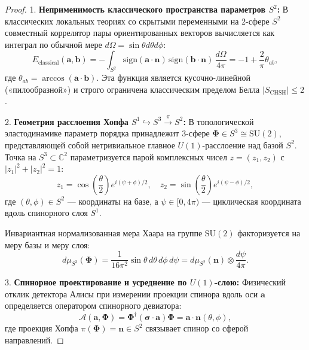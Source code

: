 \documentclass[12pt,a4paper]{article}
\begin{document}
	\begin{proof}
		1. \textbf{Неприменимость классического пространства параметров $S^2$:}
		В классических локальных теориях со скрытыми переменными на 2-сфере $S^2$ совместный коррелятор пары ориентированных векторов вычисляется как интеграл по обычной мере $d\Omega = \sin\theta d\theta d\phi$:
		\begin{equation}
			E_{\text{classical}}(\mathbf{a}, \mathbf{b}) = -\int_{S^2} \mathrm{sign}(\mathbf{a} \cdot \mathbf{n}) \, \mathrm{sign}(\mathbf{b} \cdot \mathbf{n}) \, \frac{d\Omega}{4\pi} = -1 + \frac{2}{\pi}\theta_{ab},
		\end{equation}
		где $\theta_{ab} = \arccos(\mathbf{a} \cdot \mathbf{b})$. Эта функция является кусочно-линейной («пилообразной») и строго ограничена классическим пределом Белла $|S_{\text{CHSH}}| \le 2$.
		
		2. \textbf{Геометрия расслоения Хопфа $S^1 \hookrightarrow S^3 \xrightarrow{\pi} S^2$:}
		В топологической эластодинамике параметр порядка принадлежит 3-сфере $\boldsymbol{\Phi} \in S^3 \cong \mathrm{SU}(2)$, представляющей собой нетривиальное главное $U(1)$-расслоение над базой $S^2$. Точка на $S^3 \subset \mathbb{C}^2$ параметризуется парой комплексных чисел $z = (z_1, z_2)$ с $|z_1|^2 + |z_2|^2 = 1$:
		\begin{equation}
			z_1 = \cos\left(\frac{\theta}{2}\right) e^{i(\psi + \phi)/2}, \quad z_2 = \sin\left(\frac{\theta}{2}\right) e^{i(\psi - \phi)/2},
		\end{equation}
		где $(\theta, \phi) \in S^2$ --- координаты на базе, а $\psi \in [0, 4\pi)$ --- циклическая координата вдоль спинорного слоя $S^1$.
		
		Инвариантная нормализованная мера Хаара на группе $\mathrm{SU}(2)$ факторизуется на меру базы и меру слоя:
		\begin{equation}
			d\mu_{S^3}(\boldsymbol{\Phi}) = \frac{1}{16\pi^2} \sin\theta \, d\theta \, d\phi \, d\psi = d\mu_{S^2}(\mathbf{n}) \otimes \frac{d\psi}{4\pi}.
		\end{equation}
		
		3. \textbf{Спинорное проектирование и усреднение по $U(1)$-слою:}
		Физический отклик детектора Алисы при измерении проекции спинора вдоль оси $\mathbf{a}$ определяется оператором спинорного девиатора:
		\begin{equation}
			\mathcal{A}(\mathbf{a}, \boldsymbol{\Phi}) = \boldsymbol{\Phi}^\dagger (\boldsymbol{\sigma} \cdot \mathbf{a}) \boldsymbol{\Phi} = \mathbf{a} \cdot \mathbf{n}(\theta, \phi),
		\end{equation}
		где проекция Хопфа $\pi(\boldsymbol{\Phi}) = \mathbf{n} \in S^2$ связывает спинор со сферой направлений. 
		

\end{proof}
\end{document}
